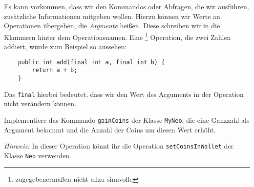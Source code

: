 \begin{enumerate}[label=\alph*)]
            Es kann vorkommen, dass wir den Kommandos oder Abfragen, die wir ausführen, zusätzliche Informationen mitgeben wollen. Hierzu können wir Werte an Operationen übergeben, die \emph{Argmente} heißen. Diese schreiben wir in die Klammern hinter dem Operationsnamen. Eine \footnote{zugegebenermaßen nicht allzu sinnvolle} Operation, die zwei Zahlen addiert, würde zum Beispiel so aussehen:
        \begin{lstlisting}
    public int add(final int a, final int b) {
        return a + b;
    }
        \end{lstlisting}
        Das \lstinline{final} hierbei bedeutet, dass wir den Wert des Arguments in der Operation nicht verändern können.
    
        \excercise Implementiere das Kommando \lstinline{gainCoins} der Klasse \lstinline{MyNeo}, die eine Ganzzahl als Argument bekommt und die Anzahl der Coins um diesen Wert erhöht.
    
        \emph{Hinweis:} In dieser Operation könnt ihr die Operation \lstinline{setCoinsInWallet} der Klasse \lstinline{Neo} verwenden.\par
    \end{enumerate}

